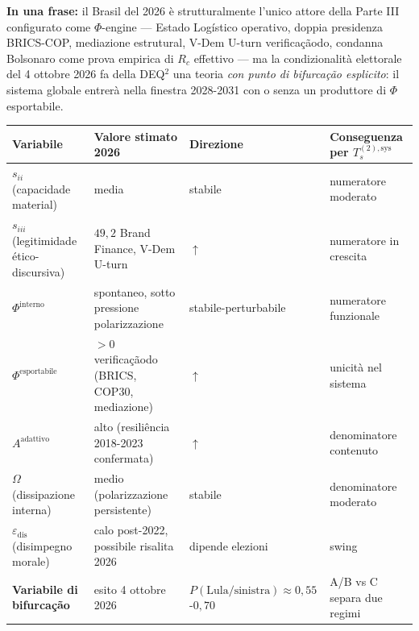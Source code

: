 \Proved{} \textbf{In una frase:} il Brasil del 2026 è strutturalmente
l'unico attore della Parte III configurato come \(\Phi\)-engine ---
Estado Logístico operativo, doppia presidenza BRICS-COP, mediazione
estrutural, V-Dem U-turn verificaçãodo, condanna Bolsonaro come prova
empirica di \(R_c\) effettivo --- ma la condizionalità elettorale del 4
ottobre 2026 fa della DEQ$^2$ una teoria \emph{con punto di bifurcação
esplicito}: il sistema globale entrerà nella finestra 2028-2031 con o
senza un produttore di \(\Phi\) esportabile.

{\def\LTcaptype{none} %
{\small\begin{longtable}[]{@{}
  >{\raggedright\arraybackslash}p{}
  >{\raggedright\arraybackslash}p{}
  >{\raggedright\arraybackslash}p{}
  >{\raggedright\arraybackslash}p{}@{}}
\toprule\noalign{}
\begin{minipage}[b]{\linewidth}\raggedright
Variabile
\end{minipage} & \begin{minipage}[b]{\linewidth}\raggedright
Valore stimato 2026
\end{minipage} & \begin{minipage}[b]{\linewidth}\raggedright
Direzione
\end{minipage} & \begin{minipage}[b]{\linewidth}\raggedright
Conseguenza per \(T_s^{(2),\text{sys}}\)
\end{minipage} \\
\midrule\noalign{}
\endhead
\bottomrule\noalign{}
\endlastfoot
\(s_{ii}\) (capacidade material) & media & stabile & numeratore
moderato \\
\(s_{iii}\) (legitimidade ético-discursiva) & \(49{,}2\) Brand Finance,
V-Dem U-turn & \(\uparrow\) & numeratore in crescita \\
\(\Phi^{\text{interno}}\) & spontaneo, sotto pressione polarizzazione &
stabile-perturbabile & numeratore funzionale \\
\(\Phi^{\text{esportabile}}\) & \(> 0\) verificaçãodo (BRICS, COP30,
mediazione) & \(\uparrow\) & unicità nel sistema \\
\(A^{\text{adattivo}}\) & alto (resiliência 2018-2023 confermata) &
\(\uparrow\) & denominatore contenuto \\
\(\Omega\) (dissipazione interna) & medio (polarizzazione persistente) &
stabile & denominatore moderato \\
\(\varepsilon_{\text{dis}}\) (disimpegno morale) & calo post-2022,
possibile risalita 2026 & dipende elezioni & swing \\
\textbf{Variabile di bifurcação} & esito 4 ottobre 2026 &
\(P(\text{Lula/sinistra}) \approx 0{,}55\)-\(0{,}70\) & A/B vs C separa
due regimi \\
\end{longtable}}
}

